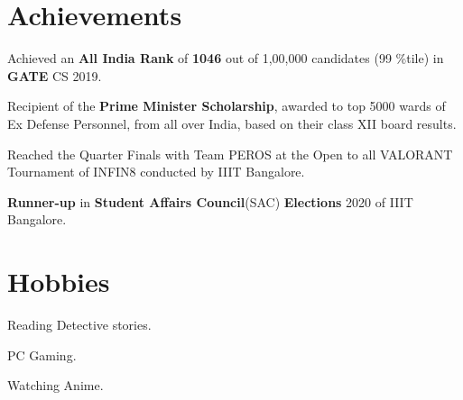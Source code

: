 \documentclass[]{essdee-resume}
\begin{document}
\begin{minipage}[t]{0.66\textwidth}
\section{Achievements} 
\vspace{\topsep}    %
\begin{tightemize}
\item Achieved an \textbf{All India Rank} of \textbf{1046} out of 1,00,000 candidates (99 \%tile) in 
\textbf{GATE} CS 2019.
\item Recipient of the \textbf{Prime Minister Scholarship}, awarded to top 5000 wards of Ex Defense Personnel, from all over India, based on their class XII board results.
\item Reached the Quarter Finals with Team PEROS at the Open to all VALORANT Tournament of INFIN8 conducted by IIIT Bangalore.
\item \textbf{Runner-up} in \textbf{Student Affairs Council}(SAC) \textbf{Elections} 2020 of IIIT Bangalore.
\end{tightemize}

\section{Hobbies}
\vspace{\topsep}    %
\begin{tightemize}
\item Reading Detective stories.
\item PC Gaming.
\item Watching Anime.
\end{tightemize}

\end{minipage} 
\end{document}

